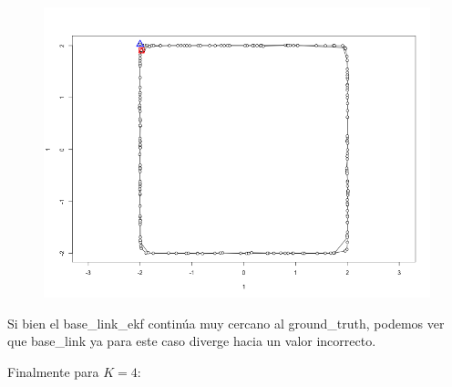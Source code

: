 \begin{figure}[!htb]
\begin{center}
\includegraphics[width=\linewidth/2]{imagenesTrayectorias/ekf/ekf1.png}
\end{center}
\end{figure}
\FloatBarrier


Si bien el base\_link\_ekf continúa muy cercano al ground\_truth, podemos ver que base\_link ya para este caso diverge hacia un valor incorrecto.

Finalmente para $K=4$:

